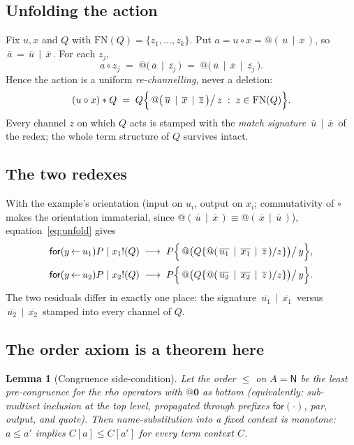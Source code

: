 \documentclass[11pt]{article}
\makeatletter
\theoremstyle{plain}
\newtheorem{lemma}{Lemma}
\theoremstyle{definition}
\theoremstyle{remark}
\newcommand{\nil}{\mathbf{0}}
\newcommand{\for}[2]{\mathsf{for}(#1 \,{\leftarrow}\, #2)}
\newcommand{\out}[2]{#1\mathord{!}(#2)}
\newcommand{\quo}[1]{@#1}
\newcommand{\dr}[1]{\,\overline{#1}\,}   %
\newcommand{\act}{\mathbin{*}}
\newcommand{\cmp}{\mathbin{\circ}}       %
\newcommand{\redto}{\longrightarrow}
\newcommand{\Names}{\mathsf{N}}
\newcommand{\FN}{\mathrm{FN}}
\makeatother
\begin{document}
\subsection{Unfolding the action}

Fix $u,x$ and $Q$ with $\FN(Q)=\{z_1,\dots,z_k\}$. Put $a=u\cmp x=\quo{(\dr u\mid \dr x)}$, so
$\dr a=\dr u\mid \dr x$. For each $z_j$,
\[
a\cmp z_j \;=\; \quo{\big(\dr a\mid \dr{z_j}\big)} \;=\; \quo{\big(\dr u\mid \dr x\mid \dr{z_j}\big)}.
\]
Hence the action is a uniform \emph{re-channelling}, never a deletion:
\begin{equation}\label{eq:unfold}
(u\cmp x)\act Q \;=\; Q\Bigl\{\,\quo{\big(\dr u\mid \dr x\mid \dr z\big)}\big/\,z \;:\; z\in\FN(Q)\Bigr\}.
\end{equation}
Every channel $z$ on which $Q$ acts is stamped with the \emph{match signature} $\dr u\mid \dr x$ of
the redex; the whole term structure of $Q$ survives intact.

\subsection{The two redexes}

With the example's orientation (input on $u_i$, output on $x_i$; commutativity of $\cmp$ makes the
orientation immaterial, since $\quo{(\dr u\mid \dr x)}\equiv\quo{(\dr x\mid \dr u)}$),
equation~\eqref{eq:unfold} gives
\begin{align*}
\for{y}{u_1}P \mid \out{x_1}{Q}
&\;\redto\; P\Bigl\{\,\quo{\big(Q\{\quo{(\dr{u_1}\mid \dr{x_1}\mid \dr z)}/z\}\big)}\big/\,y\Bigr\},\\[2pt]
\for{y}{u_2}P \mid \out{x_2}{Q}
&\;\redto\; P\Bigl\{\,\quo{\big(Q\{\quo{(\dr{u_2}\mid \dr{x_2}\mid \dr z)}/z\}\big)}\big/\,y\Bigr\}.
\end{align*}
The two residuals differ in exactly one place: the signature $\dr{u_1}\mid \dr{x_1}$ versus
$\dr{u_2}\mid \dr{x_2}$ stamped into every channel of $Q$.

\subsection{The order axiom is a theorem here}

\begin{lemma}[Congruence side-condition]\label{lem:cong}
Let the order $\le$ on $A=\Names$ be the least pre-congruence for the rho operators with
$\quo\nil$ as bottom (equivalently: sub-multiset inclusion at the top level, propagated through
prefixes $\mathsf{for}(\cdot)$, par, output, and quote). Then name-substitution into a fixed context
is monotone: $a\le a'$ implies $C[a]\le C[a']$ for every term context $C$.
\end{lemma}
\end{document}
